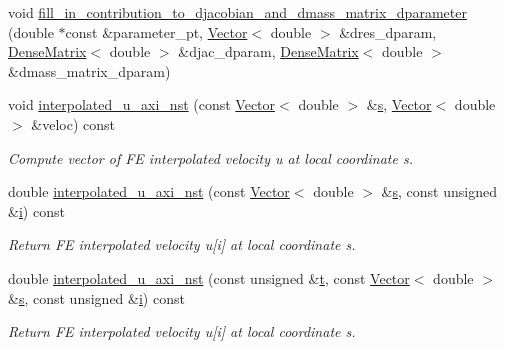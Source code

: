 \begin{DoxyCompactItemize}
void \hyperlink{classoomph_1_1GeneralisedNewtonianAxisymmetricNavierStokesEquations_a1456ce3e18f58d639fb29fb51f5f6a68}{fill\+\_\+in\+\_\+contribution\+\_\+to\+\_\+djacobian\+\_\+and\+\_\+dmass\+\_\+matrix\+\_\+dparameter} (double $\ast$const \&parameter\+\_\+pt, \hyperlink{classoomph_1_1Vector}{Vector}$<$ double $>$ \&dres\+\_\+dparam, \hyperlink{classoomph_1_1DenseMatrix}{Dense\+Matrix}$<$ double $>$ \&djac\+\_\+dparam, \hyperlink{classoomph_1_1DenseMatrix}{Dense\+Matrix}$<$ double $>$ \&dmass\+\_\+matrix\+\_\+dparam)
\item 
void \hyperlink{classoomph_1_1GeneralisedNewtonianAxisymmetricNavierStokesEquations_afe5bec055537094e7905554aaf6703fb}{interpolated\+\_\+u\+\_\+axi\+\_\+nst} (const \hyperlink{classoomph_1_1Vector}{Vector}$<$ double $>$ \&\hyperlink{cfortran_8h_ab7123126e4885ef647dd9c6e3807a21c}{s}, \hyperlink{classoomph_1_1Vector}{Vector}$<$ double $>$ \&veloc) const
\begin{DoxyCompactList}\small\item\em Compute vector of FE interpolated velocity u at local coordinate s. \end{DoxyCompactList}\item 
double \hyperlink{classoomph_1_1GeneralisedNewtonianAxisymmetricNavierStokesEquations_a186be2522c8c7d91ce98f467632bb8e1}{interpolated\+\_\+u\+\_\+axi\+\_\+nst} (const \hyperlink{classoomph_1_1Vector}{Vector}$<$ double $>$ \&\hyperlink{cfortran_8h_ab7123126e4885ef647dd9c6e3807a21c}{s}, const unsigned \&\hyperlink{cfortran_8h_adb50e893b86b3e55e751a42eab3cba82}{i}) const
\begin{DoxyCompactList}\small\item\em Return FE interpolated velocity u\mbox{[}i\mbox{]} at local coordinate s. \end{DoxyCompactList}\item 
double \hyperlink{classoomph_1_1GeneralisedNewtonianAxisymmetricNavierStokesEquations_ad3eb5c16ef5aae9e1b66f52b371629df}{interpolated\+\_\+u\+\_\+axi\+\_\+nst} (const unsigned \&\hyperlink{cfortran_8h_af6f0bd3dc13317f895c91323c25c2b8f}{t}, const \hyperlink{classoomph_1_1Vector}{Vector}$<$ double $>$ \&\hyperlink{cfortran_8h_ab7123126e4885ef647dd9c6e3807a21c}{s}, const unsigned \&\hyperlink{cfortran_8h_adb50e893b86b3e55e751a42eab3cba82}{i}) const
\begin{DoxyCompactList}\small\item\em Return FE interpolated velocity u\mbox{[}i\mbox{]} at local coordinate s. \end{DoxyCompactList}\item 

\end{DoxyCompactItemize}
